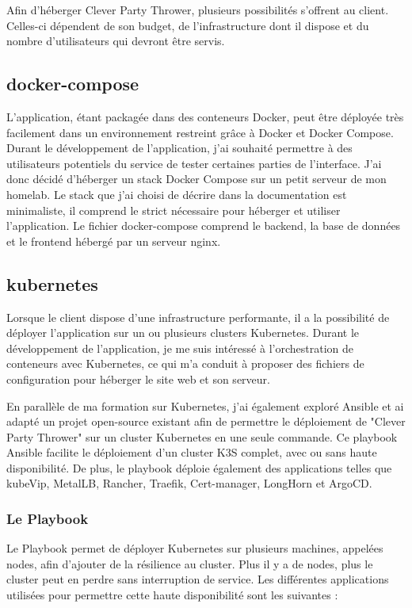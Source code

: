 Afin d'héberger Clever Party Thrower, plusieurs possibilités s'offrent au client.
Celles-ci dépendent de son budget, de l'infrastructure dont il dispose et du nombre d'utilisateurs qui devront être servis.

\subsection{docker-compose}\label{subsec:docker-compose}
L'application, étant packagée dans des conteneurs Docker, peut être déployée très facilement dans un environnement restreint grâce à Docker et Docker Compose.
Durant le développement de l'application, j'ai souhaité permettre à des utilisateurs potentiels du service de tester certaines parties de l'interface.
J'ai donc décidé d'héberger un stack Docker Compose sur un petit serveur de mon homelab.
Le stack que j'ai choisi de décrire dans la documentation est minimaliste, il comprend le strict nécessaire pour héberger et utiliser l'application.
Le fichier docker-compose comprend le backend, la base de données et le frontend hébergé par un serveur nginx.

\subsection{kubernetes}\label{subsec:kubernetes}
Lorsque le client dispose d'une infrastructure performante, il a la possibilité de déployer l'application sur un ou plusieurs clusters Kubernetes.
Durant le développement de l'application, je me suis intéressé à l'orchestration de conteneurs avec Kubernetes, ce qui m'a conduit à proposer des fichiers de configuration pour héberger le site web et son serveur.

En parallèle de ma formation sur Kubernetes, j'ai également exploré Ansible et ai adapté un projet open-source existant afin de permettre le déploiement de "Clever Party Thrower" sur un cluster Kubernetes en une seule commande.
Ce playbook Ansible facilite le déploiement d'un cluster K3S complet, avec ou sans haute disponibilité.
De plus, le playbook déploie également des applications telles que kubeVip, MetalLB, Rancher, Traefik, Cert-manager, LongHorn et ArgoCD.

\subsubsection{Le Playbook}
Le Playbook permet de déployer Kubernetes sur plusieurs machines, appelées nodes, afin d'ajouter de la résilience au cluster. Plus il y a de nodes, plus le cluster peut en perdre sans interruption de service. Les différentes applications utilisées pour permettre cette haute disponibilité sont les suivantes :

